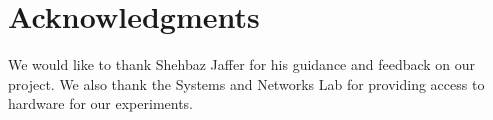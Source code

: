 \section*{Acknowledgments}
We would like to thank Shehbaz Jaffer for his guidance and feedback on our
project. We also thank the Systems and Networks Lab for providing access to
hardware for our experiments.
